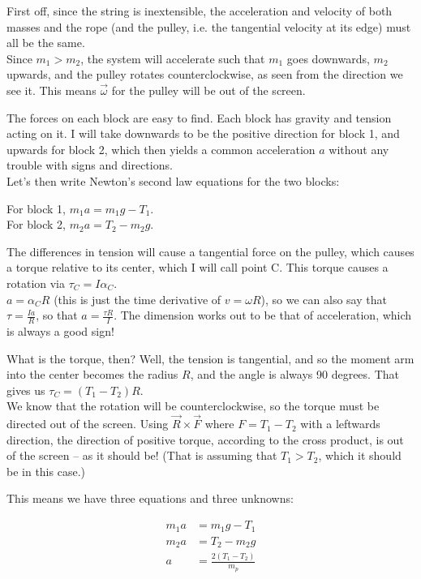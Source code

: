 \documentclass[12pt,a4paper]{report}
\begin{document}
First off, since the string is inextensible, the acceleration and velocity of both masses and the rope (and the pulley, i.e. the tangential velocity at its edge) must all be the same.\\
Since $m_1 > m_2$, the system will accelerate such that $m_1$ goes downwards, $m_2$ upwards, and the pulley rotates counterclockwise, as seen from the direction we see it. This means $\vec{\omega}$ for the pulley will be out of the screen.

The forces on each block are easy to find. Each block has gravity and tension acting on it. I will take downwards to be the positive direction for block 1, and upwards for block 2, which then yields a common acceleration $a$ without any trouble with signs and directions.\\
Let's then write Newton's second law equations for the two blocks:

For block 1, $m_1 a = m_1 g - T_1$.\\
For block 2, $m_2 a = T_2 - m_2 g$.

The differences in tension will cause a tangential force on the pulley, which causes a torque relative to its center, which I will call point C. This torque causes a rotation via $\tau_C = I \alpha_C$.\\
$a = \alpha_C R$ (this is just the time derivative of $v = \omega R$), so we can also say that $\displaystyle \tau = \frac{I a}{R}$, so that $\displaystyle a = \frac{\tau R}{I}$. The dimension works out to be that of acceleration, which is always a good sign!

What is the torque, then? Well, the tension is tangential, and so the moment arm into the center becomes the radius $R$, and the angle is always 90 degrees. That gives us $\tau_C = (T_1 - T_2) R$.\\
We know that the rotation will be counterclockwise, so the torque must be directed out of the screen. Using $\vec{R} \times \vec{F}$ where $F = T_1 - T_2$ with a leftwards direction, the direction of positive torque, according to the cross product, is out of the screen -- as it should be! (That is assuming that $T_1 > T_2$, which it should be in this case.)

This means we have three equations and three unknowns:

\begin{align}
m_1 a &= m_1 g - T_1\\
m_2 a &= T_2 - m_2 g\\
a &= \frac{2(T_1 - T_2)}{m_p}
\end{align}
\end{document}
